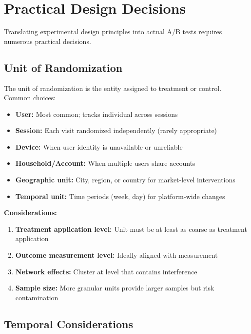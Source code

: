 \section{Practical Design Decisions}

Translating experimental design principles into actual A/B tests requires numerous practical decisions.

\subsection{Unit of Randomization}

The unit of randomization is the entity assigned to treatment or control. Common choices:

\begin{itemize}
    \item \textbf{User:} Most common; tracks individual across sessions
    \item \textbf{Session:} Each visit randomized independently (rarely appropriate)
    \item \textbf{Device:} When user identity is unavailable or unreliable
    \item \textbf{Household/Account:} When multiple users share accounts
    \item \textbf{Geographic unit:} City, region, or country for market-level interventions
    \item \textbf{Temporal unit:} Time periods (week, day) for platform-wide changes
\end{itemize}

\textbf{Considerations:}

\begin{enumerate}
    \item \textbf{Treatment application level:} Unit must be at least as coarse as treatment application

    \item \textbf{Outcome measurement level:} Ideally aligned with measurement

    \item \textbf{Network effects:} Cluster at level that contains interference

    \item \textbf{Sample size:} More granular units provide larger samples but risk contamination
\end{enumerate}

\subsection{Temporal Considerations}


